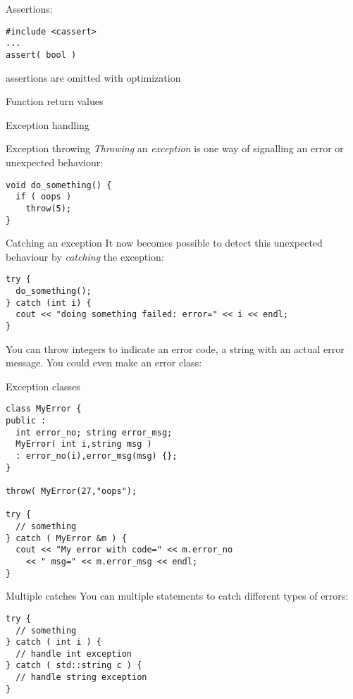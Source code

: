 Assertions:
\begin{verbatim}
#include <cassert>
...
assert( bool )
\end{verbatim}
assertions are omitted with optimization

Function return values

 {Exception handling}

\begin{block}{Exception throwing}
  \label{sl:exception-throw}
  \emph{Throwing} an \emph{exception}%
   is one way of signalling an error or
  unexpected behaviour:
\begin{verbatim}
void do_something() {
  if ( oops )
    throw(5);
}
\end{verbatim}
\end{block}

\begin{block}{Catching an exception}
  \label{sl:exception-catch}
  It now becomes possible to detect this unexpected behaviour by
  \emph{catching}
  the exception:
\begin{verbatim}
try {
  do_something();
} catch (int i) {
  cout << "doing something failed: error=" << i << endl;
}
\end{verbatim}
\end{block}

You can throw integers to indicate an error code, a string with an
actual error message. You could even make an error class:

\begin{block}{Exception classes}
  \label{sl:exception-class}
\begin{verbatim}
class MyError {
public :
  int error_no; string error_msg;
  MyError( int i,string msg )
  : error_no(i),error_msg(msg) {};
}

throw( MyError(27,"oops");

try {
  // something
} catch ( MyError &m ) {
  cout << "My error with code=" << m.error_no
    << " msg=" << m.error_msg << endl;
}
\end{verbatim}
\end{block}

\begin{block}{Multiple catches}
  \label{sl:exception-catches}
  You can multiple  statements to catch different types of
  errors:
\begin{verbatim}
try {
  // something
} catch ( int i ) {
  // handle int exception
} catch ( std::string c ) {
  // handle string exception
}
\end{verbatim}
\end{block}

